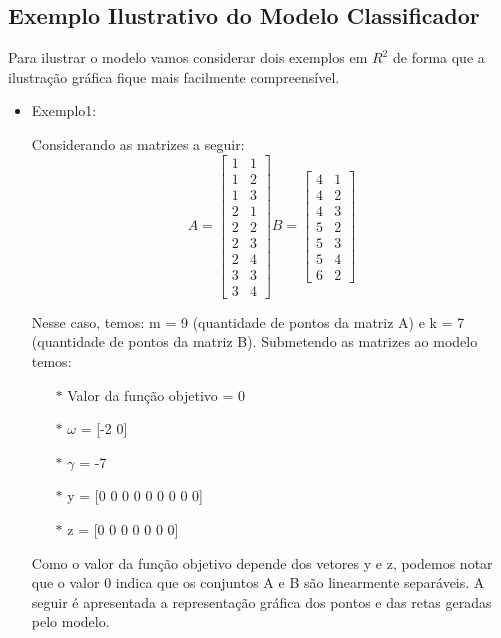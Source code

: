 \subsection{Exemplo Ilustrativo do Modelo Classificador}
Para ilustrar o modelo vamos considerar dois exemplos em $R^{2}$ \cite{Bennett92robustlinear} de forma que a ilustração gráfica fique mais facilmente compreensível.
\begin{itemize}
\item Exemplo1:

Considerando as matrizes a seguir:
$$A=\begin{bmatrix}1 & 1\\ 1 & 2\\ 1 & 3\\ 2 & 1\\ 2 & 2\\ 2 & 3\\ 2 & 4\\ 3 & 3\\ 3 & 4\end{bmatrix}
B=\begin{bmatrix}4 & 1\\ 4 & 2\\ 4 & 3\\ 5 & 2\\ 5 & 3\\ 5 & 4\\ 6 & 2\end{bmatrix}$$

Nesse caso, temos: m = 9 (quantidade de pontos da matriz A) e k = 7 (quantidade de pontos da matriz B).  Submetendo as matrizes ao modelo temos:
\begin{itemize}
\item[$\ast$] Valor da função objetivo = 0
\item[$\ast$] $\omega$ = [-2  0]
\item[$\ast$] $\gamma$ = -7
\item[$\ast$] y = [0 0 0 0 0 0 0 0 0]
\item[$\ast$] z = [0 0 0 0 0 0 0]
\end{itemize}
Como o valor da função objetivo depende dos vetores y e z, podemos notar que o valor 0 indica que os conjuntos A e B são linearmente separáveis. A seguir é apresentada a representação gráfica dos pontos e das retas geradas pelo modelo.


\end{itemize}
